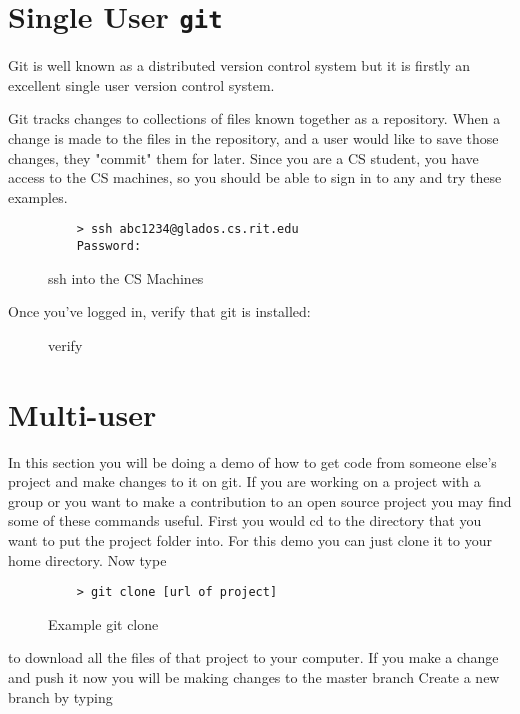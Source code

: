 \documentclass[11pt]{report}
\begin{document}
\chapter{Single User \texttt{git}}
Git is well known as a distributed version control system but it is
firstly an excellent single user version control system.

Git tracks changes to collections of files known together as a repository.
When a change is made to the files in the repository, and a user would like
to save those changes, they "commit" them for later. Since you are a CS student,
you have access to the CS machines, so you should be able to sign in to any and
try these examples.

\begin{figure}[H]
  \caption{ssh into the CS Machines}
  \begin{lstlisting}
    > ssh abc1234@glados.cs.rit.edu
    Password:
  \end{lstlisting}
\end{figure}

Once you've logged in, verify that git is installed:

\begin{figure}[H]
  
\end{figure}

\begin{figure}[H]
  \caption{verify}
  
\end{figure}

\chapter{Multi-user}
In this section you will be doing a demo of how to get code from
someone else's project and make changes to it on git. If you are
working on a project with a group or you want to make a contribution
to an open source project you may find some of these commands useful.
First you would cd to the directory that you want to put the project
folder into.  For this demo you can just clone it to your home
directory.  Now type
\begin{figure}[H]
  \caption{Example git clone}
  \begin{lstlisting}
    > git clone [url of project]
  \end{lstlisting}
\end{figure}


to download all the files of that project to your computer.  If you
make a change and push it now you will be making changes to the master
branch Create a new branch by typing
\end{document}
